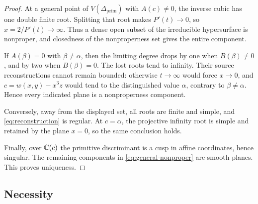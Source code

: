 \documentclass[11pt,reqno]{amsart}
\begin{document}
\begin{proof}
At a general point of \(V(\Delta_{\mathrm{prim}})\) with \(A(c)\ne0\),
the inverse cubic has one double finite root.  Splitting that root makes
\(P'(t)\to0\), so \(x=2/P'(t)\to\infty\).  Thus a dense open subset of
the irreducible hypersurface is nonproper, and closedness of the
nonproperness set gives the entire component.

If \(A(\beta)=0\) with \(\beta\ne\alpha\), then the limiting degree drops
by one when \(B(\beta)\ne0\), and by two when \(B(\beta)=0\).  The lost
roots tend to infinity.  Their source reconstructions cannot remain bounded:
otherwise \(t\to\infty\) would force \(x\to0\), and
\(c=w(x,y)-x^3z\) would tend to the distinguished value \(\alpha\), contrary
to \(\beta\ne\alpha\).  Hence every indicated plane is a nonproperness
component.

Conversely, away from the displayed set, all roots are finite and simple,
and \eqref{eq:reconstruction} is regular.  At \(c=\alpha\), the projective
infinity root is simple and retained by the plane \(x=0\), so the same
conclusion holds.

Finally, over \(\mathbb C(c)\) the primitive discriminant is a cusp in affine
coordinates, hence singular.  The remaining components in
\eqref{eq:general-nonproper} are smooth planes.  This proves uniqueness.
\end{proof}

\subsection{Necessity}
\end{document}

